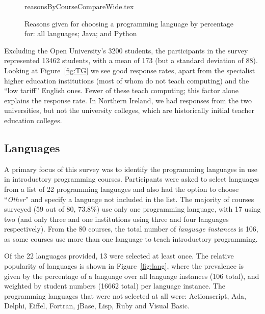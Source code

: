 \documentclass[english]{programming}
\begin{document}
\begin{figure}
\begin{center}
{reasonsByCourseCompareWide.tex}
\end{center}
\caption{Reasons given for choosing a programming language by percentage for: all languages; Java; and Python\label{fig:reasons}}
\end{figure}

Excluding the Open University's 3200 students, the participants in the
survey represented 13462 students, with a mean of 173 (but a standard
deviation of 88). Looking at Figure~\ref{fig:TG} we see good response
rates, apart from the specialist higher education institutions (most
of whom do not teach computing) and the ``low tariff'' English
ones. Fewer of these teach computing; this factor alone explains the
response rate. In Northern Ireland, we had responses from the two
universities, but not the university colleges, which are historically
initial teacher education colleges.


\subsection{Languages}\label{langs}


A primary focus of this survey was to identify the programming
languages in use in introductory programming courses. Participants
were asked to select languages from a list of 22 programming languages
and also had the option to choose ``{\emph{Other}}'' and specify a
language not included in the list. The majority of courses surveyed
(59 out of 80, 73.8\%) use only one programming language, with 17
using two (and only three and one institutions using three and four
languages respectively). From the 80 courses, the total number of
{\emph{language instances}} is 106, as some courses use more than one
language to teach introductory programming.

Of the 22 languages provided, 13 were selected at least once. The
relative popularity of languages is shown in Figure~\ref{fig:lang},
where the prevalence is given by the percentage of a language over all
language instances (106 total), and weighted by student numbers (16662
total) per language instance. The programming languages that were not
selected at all were: Actionscript, Ada, Delphi, Eiffel, Fortran,
jBase, Lisp, Ruby and Visual Basic.
\end{document}
